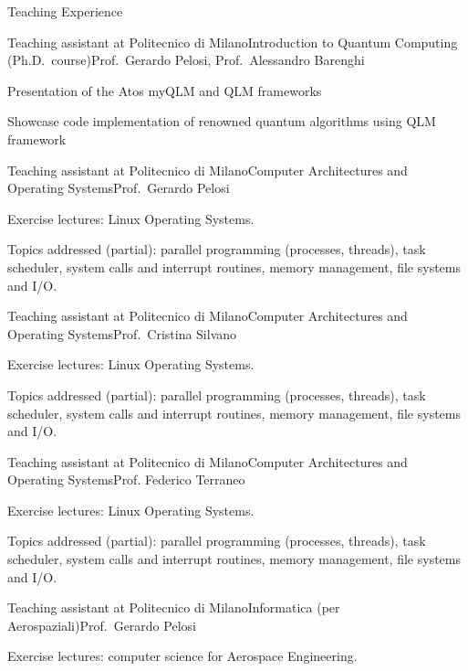 \documentclass[
	a4paper, %
	11pt, %
]{tresume} %
\begin{document}
\begin{tSection}{Teaching Experience}
  \begin{tSubsection}{Teaching assistant at Politecnico di Milano}{}{Introduction
    to Quantum Computing (Ph.D.\ course)}{Prof.\ Gerardo Pelosi, Prof.\ Alessandro Barenghi}
  \item Presentation of the Atos myQLM and QLM frameworks
  \item Showcase code implementation of renowned quantum algorithms using QLM
    framework
  \end{tSubsection}
  \begin{tSubsection}{Teaching assistant at Politecnico di Milano}{}{Computer Architectures and Operating Systems}{Prof.\ Gerardo Pelosi}
  \item Exercise lectures: Linux Operating Systems.
  \item Topics addressed (partial): parallel programming (processes, threads),
    task scheduler, system calls and interrupt routines, memory management, file
    systems and I/O.
  \end{tSubsection}
  \begin{tSubsection}{Teaching assistant at Politecnico di Milano}{}{Computer Architectures and
      Operating Systems}{Prof.\ Cristina Silvano }
  \item Exercise lectures: Linux Operating Systems.
  \item Topics addressed (partial): parallel programming (processes, threads),
    task scheduler, system calls and interrupt routines, memory management, file
    systems and I/O.
  \end{tSubsection}
  \begin{tSubsection}{Teaching assistant at Politecnico di Milano}{}{Computer Architectures and
      Operating Systems}{Prof. Federico Terraneo }
  \item Exercise lectures: Linux Operating Systems.
  \item Topics addressed (partial): parallel programming (processes, threads),
    task scheduler, system calls and interrupt routines, memory management, file
    systems and I/O.
  \end{tSubsection}
  \begin{tSubsection}{Teaching assistant at Politecnico di Milano}{}{Informatica (per Aerospaziali)}{Prof.\ Gerardo Pelosi}
  \item Exercise lectures: computer science for Aerospace Engineering.

\end{tSubsection}
\end{tSection}
\end{document}
